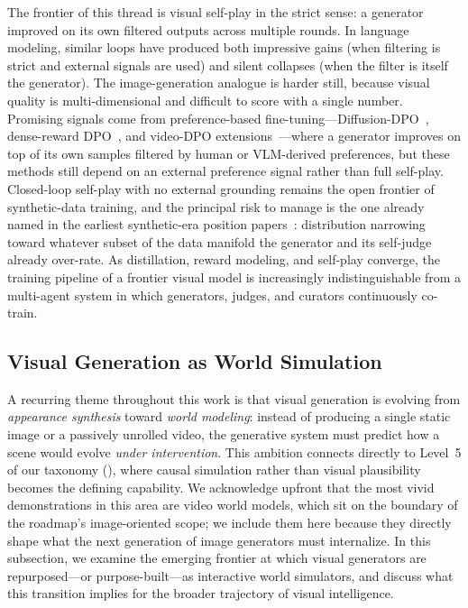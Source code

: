 The frontier of this thread is visual self-play in the strict sense: a generator improved on its own filtered outputs across multiple rounds. In language modeling, similar loops have produced both impressive gains (when filtering is strict and external signals are used) and silent collapses (when the filter is itself the generator). The image-generation analogue is harder still, because visual quality is multi-dimensional and difficult to score with a single number. Promising signals come from preference-based fine-tuning---Diffusion-DPO~\citep{wallace2024diffusion}, dense-reward DPO~\citep{yang2024dense}, and video-DPO extensions~\citep{liu2025videodpo}---where a generator improves on top of its own samples filtered by human or VLM-derived preferences, but these methods still depend on an external preference signal rather than full self-play. Closed-loop self-play with no external grounding remains the open frontier of synthetic-data training, and the principal risk to manage is the one already named in the earliest synthetic-era position papers~\citep{yang2023aigs}: distribution narrowing toward whatever subset of the data manifold the generator and its self-judge already over-rate. As distillation, reward modeling, and self-play converge, the training pipeline of a frontier visual model is increasingly indistinguishable from a multi-agent system in which generators, judges, and curators continuously co-train.

\subsection{Visual Generation as World Simulation}
\label{subsec:world_models}

A recurring theme throughout this work is that visual generation is evolving from \emph{appearance synthesis} toward \emph{world modeling}: instead of producing a single static image or a passively unrolled video, the generative system must predict how a scene would evolve \emph{under intervention}. This ambition connects directly to Level~5 of our taxonomy (), where causal simulation rather than visual plausibility becomes the defining capability. We acknowledge upfront that the most vivid demonstrations in this area are video world models, which sit on the boundary of the roadmap's image-oriented scope; we include them here because they directly shape what the next generation of image generators must internalize. In this subsection, we examine the emerging frontier at which visual generators are repurposed---or purpose-built---as interactive world simulators, and discuss what this transition implies for the broader trajectory of visual intelligence.

